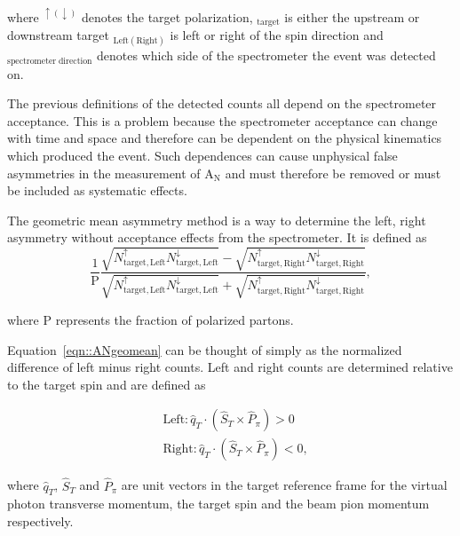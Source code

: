 \noindent
where $^{\uparrow(\downarrow)}$ denotes the target polarization,
$_{\mathrm{target}}$ is either the upstream or downstream target
$_{\mathrm{Left(Right)}}$ is left or right of the spin direction and
${_\mathrm{spectrometer \; direction}}$ denotes which side of the spectrometer
the event was detected on.

The previous definitions of the detected counts all depend on the spectrometer
acceptance.  This is a problem because the spectrometer acceptance can change
with time and space and therefore can be dependent on the physical kinematics
which produced the event.  Such dependences can cause unphysical false
asymmetries in the measurement of A$_{\mathrm{N}}$ and must therefore be removed
or must be included as systematic effects.

The geometric mean asymmetry method is a way to determine the left, right
asymmetry without acceptance effects from the spectrometer.  It is defined as
\begin{equation}
  \label{eqn::ANgeomean}
\frac{1}{\mathrm{P}}\frac{\sqrt{N_{\mathrm{target,
        Left}}^{\uparrow}N_{\mathrm{target, Left}}^{\downarrow}} -
  \sqrt{N_{\mathrm{target, Right}}^{\uparrow}N_{\mathrm{target,
        Right}}^{\downarrow}} }{\sqrt{N_{\mathrm{target,
        Left}}^{\uparrow}N_{\mathrm{target, Left}}^{\downarrow}} +
  \sqrt{N_{\mathrm{target, Right}}^{\uparrow}N_{\mathrm{target,
        Right}}^{\downarrow}} },
\end{equation}

\noindent
where P represents the fraction of polarized partons.

Equation~\ref{eqn::ANgeomean} can be thought of simply as the normalized difference of left minus right counts.  Left and right counts are determined relative to the target spin and are defined as

\begin{equation}
  \label{equ::Defleftright}
  \begin{aligned}
    &\text{Left}: \hat{q}_T \cdot (\hat{S}_T \times \hat{P}_{\pi}) > 0 \\
    &\text{Right}: \hat{q}_T \cdot (\hat{S}_T \times \hat{P}_{\pi}) < 0, 
  \end{aligned}
\end{equation}

\noindent
where $\hat{q}_T$, $\hat{S}_T$ and $\hat{P}_{\pi}$ are unit vectors in the
target reference frame for the virtual photon transverse momentum, the target
spin and the beam pion momentum respectively.

